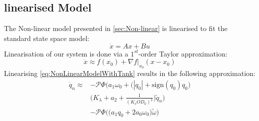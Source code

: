 \subsection{linearised Model}
The Non-linear model presented in \cref{sec:Non-linear} is linearised to fit the standard state space model:
\begin{equation*}
	\dot{x}=Ax+Bu
\end{equation*}
Linearisation of our system is done via a $ 1^{st} $-order Taylor approximation: 
\begin{equation}\label{eq:TaylorSeries}
	\dot{x} \approx f(x_0) + \nabla f\bigg\rvert_{x_0} (x-x_0)
\end{equation}
Linearising \cref{eq:NonLinearModelWithTank} results in the following approximation:
\begin{equation}\label{eq:LinearisedModelWithTank}
	\begin{split}
	\dot{q}_n \approx &-\mathcal{P}\Phi\Bigg(a_1\omega_0 + \Big(|q_0|+\text{sign}(q_0)q_0\Big)\\
	&\Bigg(K_\lambda + a_2 + \frac{1}{(K_v OD_0)^2}\Bigg) \tilde{q}_n \Bigg)\\
	&- \mathcal{P}\Phi\Bigg(\Big(a_1 q_0 + 2a_0\omega_0\Big) \tilde{\omega}\Bigg)
	\end{split}
\end{equation}
